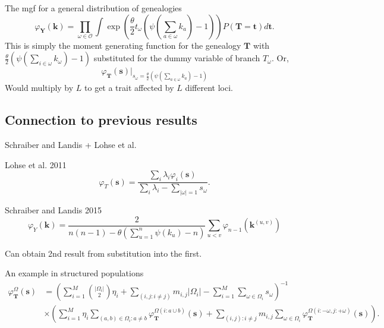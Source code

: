 \documentclass{beamer}
\begin{document}
\begin{frame}{The mgf for a general distribution of genealogies}
  \begin{equation*}
    \varphi_{\mathbf{Y}}(\mathbf{k}) = \prod_{\omega \in \mathcal{O}}
    \int \exp\left( \frac{\theta}{2} t_{\omega} \left( \psi\left(\sum_{a \in \omega}k_{a}\right) -1 \right)\right)
    P(\mathbf{T}=\mathbf{t})d\mathbf{t}.
  \end{equation*}
  This is simply the moment generating function for the genealogy
  $\mathbf{T}$ with $\frac{\theta}{2} \left( \psi(\sum_{i \in
      \omega}k_{\omega}) -1 \right)$ substituted for the dummy variable of
  branch $T_{\omega}$. Or,
  \begin{equation*}
    \label{eq:sub}
    \varphi_{\mathbf{T}}(\mathbf{s})\Bigr|_{s_{\omega}=\frac{\theta}{2} \left( \psi\left(\sum_{a \in \omega}k_{a}\right) -1 \right)}
  \end{equation*}
  Would multiply by $L$ to get a trait affected by $L$ different loci.
\end{frame}

\subsection{Connection to previous results}

\begin{frame}{Schraiber and Landis + Lohse et al.}
  \begin{block}{Lohse et al. 2011}
    \begin{equation*}
      \varphi_{T}\left( \mathbf{s} \right) = \frac{
        \sum_i \lambda_i \varphi_i(\mathbf{s})}{
        \sum_i \lambda_i - \sum_{|\omega|=1}s_{\omega}}.
    \end{equation*}
  \end{block}
  \begin{block}{Schraiber and Landis 2015}
    \begin{equation*}
      \varphi_{Y}\left( \mathbf{k} \right) = \frac{2}{
        n(n-1) - \theta \left( \sum_{u=1}^n \psi(k_u) - n\right)} \sum_{u<v}\varphi_{n-1}(\mathbf{k}^{(u,v)})
    \end{equation*}
  \end{block}
  Can obtain 2nd result from substitution into the first.
\end{frame}

\begin{frame}{An example in structured populations}
  \begin{align}
    \varphi_{\mathbf{T}}^{\Omega}(\mathbf{s}) &= \left( \sum_{i=1}^M
    \binom{|\Omega_i|}{2}\eta_i + \sum_{(i,j:i \neq j)} m_{i,j}|\Omega_i| -
    \sum_{i=1}^M \sum_{\omega \in \Omega_i}s_{\omega}\right)^{-1} \nonumber
    \\ &\times \left( \sum_{i=1}^M \eta_i \sum_{(a,b) \in \Omega_i:a \neq b}
    \varphi_{\mathbf{T}}^{\Omega(i:a \cup b)}(\mathbf{s}) + \sum_{(i,j):i\neq
      j}m_{i,j}\sum_{\omega \in \Omega_i} \varphi_{\mathbf{T}}^{\Omega\left( i
      :-\omega, j: + \omega \right)}(\mathbf{s})\right). \nonumber
  \end{align}
\end{frame}
\end{document}

